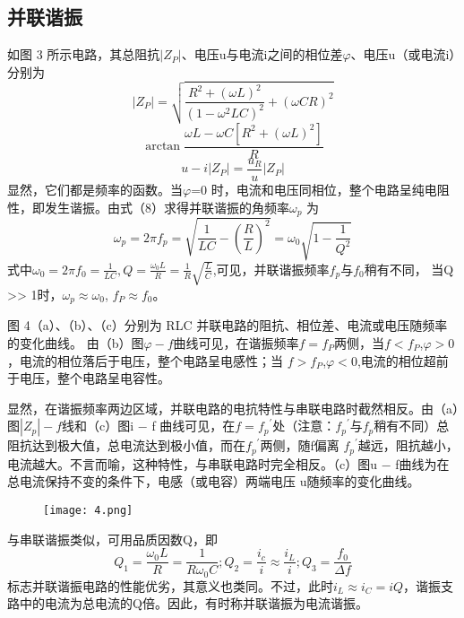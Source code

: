 \documentclass[11pt,a4paper]{article}
\begin{document}
\subsection{并联谐振}
如图 3 所示电路，其总阻抗$\left\lvert Z_P\right\rvert$、电压u与电流i之间的相位差$\varphi $、电压u（或电流i）分别为
\begin{equation}
    \left\lvert Z_P\right\rvert=\sqrt{\frac{R^2+(\omega L)^2}{(1-{\omega }^2LC)^2}+(\omega CR)^2} 
\end{equation}
\begin{equation}
    \arctan {\frac{\omega L-\omega C[R^2+(\omega L)^2]}{R}}    
\end{equation}
\begin{equation}
    u-i\left\lvert Z_P\right\rvert =\frac{u_R}{u}\left\lvert Z_P\right\rvert 
\end{equation}
显然，它们都是频率的函数。当$\varphi $=0 时，电流和电压同相位，整个电路呈纯电阻性，即发生谐振。由式（8）求得并联谐振的角频率$\omega _p$
为
\begin{equation}
    \omega _p=2\pi f_p=\sqrt{\frac{1}{LC}-(\frac{R}{L})^2} =\omega _0\sqrt{1-\frac{1}{Q^2}} 
\end{equation}
式中$\omega _0=2\pi f_0=\frac{1}{LC},Q=\frac{\omega _0L}{R}=\frac{1}{R}\sqrt{\frac{L}{C}}$,可见，并联谐振频率$f_p$与$f_0$稍有不同，
当Q >> 1时，$\omega _p\approx \omega _0$, $f_P\approx f_0$。

图 4（a）、（b）、（c）分别为 RLC 并联电路的阻抗、相位差、电流或电压随频率的变化曲线。
由（b）图$\varphi  − f$曲线可见，在谐振频率$f=f_P$两侧，当$f<f_P$,$\varphi >0$，电流的相位落后于电压，整个电路呈电感性；当
$f>f_P$,$\varphi <0$,电流的相位超前于电压，整个电路呈电容性。

显然，在谐振频率两边区域，并联电路的电抗特性与串联电路时截然相反。由（a）图$\left\lvert Z_p\right\rvert-f$线和（c）图i − f
曲线可见，在$f={f_p}^'$处（注意：${f_p}^'$与$f_p$稍有不同）总阻抗达到极大值，总电流达到极小值，而在${f_p}^'$两侧，随f偏离
${f_p}^'$越远，阻抗越小，电流越大。不言而喻，这种特性，与串联电路时完全相反。（c）图u − f曲线为在总电流保持不变的条件下，电感（或电容）两端电压
u随频率的变化曲线。
\begin{figure}[H]
    \centering
    \texttt{[image: 4.png]}
\end{figure}
与串联谐振类似，可用品质因数Q，即
\begin{equation}
    Q_1=\frac{\omega _0L}{R}=\frac{1}{R\omega _0C};Q_2=\frac{i_c}{i}\approx \frac{i_L}{i};Q_3=\frac{f_0}{\Delta f}
\end{equation}
标志并联谐振电路的性能优劣，其意义也类同。不过，此时$i_L\approx i_C = iQ$，谐振支路中的电流为总电流的Q倍。因此，有时称并联谐振为电流谐振。
\end{document}

